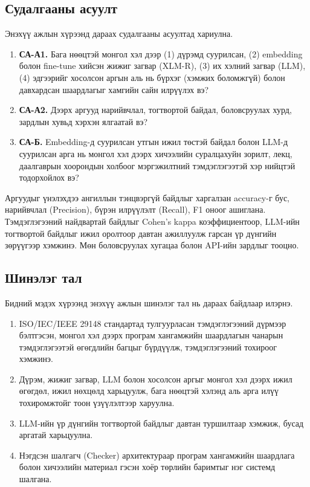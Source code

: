 \subsection*{Судалгааны асуулт}
Энэхүү ажлын хүрээнд дараах судалгааны асуултад хариулна.

\begin{enumerate}[nosep]
    \item \textbf{СА-А1.} Бага нөөцтэй монгол хэл дээр (1) дүрэмд суурилсан, (2) embedding болон fine-tune хийсэн жижиг загвар (XLM-R), (3) их хэлний загвар (LLM), (4) эдгээрийг хосолсон аргын аль нь бүрхэг (хэмжих боломжгүй) болон давхардсан шаардлагыг хамгийн сайн илрүүлэх вэ?
    \item \textbf{СА-А2.} Дээрх аргууд нарийвчлал, тогтвортой байдал, боловсруулах хурд, зардлын хувьд хэрхэн ялгаатай вэ?
    \item \textbf{СА-Б.} Embedding-д суурилсан утгын ижил төстэй байдал болон LLM-д суурилсан арга нь монгол хэл дээрх хичээлийн суралцахуйн зорилт, лекц, даалгаврын хоорондын холбоог мэргэжилтний тэмдэглэгээтэй хэр нийцтэй тодорхойлох вэ?
\end{enumerate}

Аргуудыг үнэлэхдээ ангиллын тэнцвэргүй байдлыг харгалзан accuracy-г бус, нарийвчлал (Precision), бүрэн илрүүлэлт (Recall), F1 оноог ашиглана. Тэмдэглэгээний найдвартай байдлыг Cohen's kappa коэффициентоор, LLM-ийн тогтвортой байдлыг ижил оролтоор давтан ажиллуулж гарсан үр дүнгийн зөрүүгээр хэмжинэ. Мөн боловсруулах хугацаа болон API-ийн зардлыг тооцно.

\subsection*{Шинэлэг тал}
Бидний мэдэх хүрээнд энэхүү ажлын шинэлэг тал нь дараах байдлаар илэрнэ.
\begin{enumerate}[nosep]
    \item ISO/IEC/IEEE 29148 стандартад тулгуурласан тэмдэглэгээний дүрмээр бэлтгэсэн, монгол хэл дээрх програм хангамжийн шаардлагын чанарын тэмдэглэгээтэй өгөгдлийн багцыг бүрдүүлж, тэмдэглэгээний тохироог хэмжинэ.
    \item Дүрэм, жижиг загвар, LLM болон хосолсон аргыг монгол хэл дээрх ижил өгөгдөл, ижил нөхцөлд харьцуулж, бага нөөцтэй хэлэнд аль арга илүү тохиромжтойг тоон үзүүлэлтээр харуулна.
    \item LLM-ийн үр дүнгийн тогтвортой байдлыг давтан туршилтаар хэмжиж, бусад аргатай харьцуулна.
    \item Нэгдсэн шалгагч (Checker) архитектураар програм хангамжийн шаардлага болон хичээлийн материал гэсэн хоёр төрлийн баримтыг нэг системд шалгана.
\end{enumerate}

